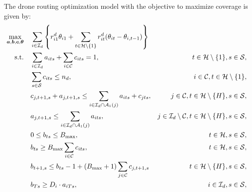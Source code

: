 \documentclass{article}
\newcommand{\set}[1]{\mathcal{#1}}
\begin{document}
The drone routing optimization model with the objective to maximize coverage is given by:
\begin{subequations} \label{eq:maxcov}
    \begin{align}
        \max_{\bm a, \bm b, \bm c, \bm \theta}  &\quad \displaystyle \sum_{i \in \set I_d} \left\{r_{i1}^d \theta_{i1} + \sum_{t \in \set H \setminus \{1\}} r_{it}^d (\theta_{it} - \theta_{i,t-1}) \right\} \label{eq:maxcov_a}%
        \\ {\rm s.t. } 
        &\quad \displaystyle \sum_{i \in \set I_d} a_{its} + \sum_{i \in \set C} c_{its} = 1, & t \in \set H \setminus \{1\}, s \in \set S, \label{eq:maxcov_b}\\
        &\quad \displaystyle \sum_{s \in \set S} c_{its} \leq n_d, & i \in \set C, t \in \set H \setminus \{1\}, \label{eq:maxcov_c}\\
        &\quad \displaystyle c_{j,t+1,s} + a_{j,t+1,s} \leq \sum_{i \in \set I_d \cap \set A_1(j)} a_{its} + c_{jts}, &  j \in \set C, t \in \set H \setminus \{H\}, s \in \set S, \label{eq:maxcov_d}\\
        &\quad \displaystyle a_{j,t+1,s} \leq \sum_{i \in \set I_d \cap \set A_1(j)} a_{its}, &  j \in \set I_d \setminus \set C, t \in \set H \setminus \{H\}, s \in \set S, \label{eq:maxcov_e}\\
        &\quad \displaystyle 0 \leq b_{ts} \leq B_{\text{max}}, & t \in \set H, s \in \set S, \label{eq:maxcov_f}\\
        &\quad \displaystyle b_{ts} \geq B_{\text{max}} \sum_{i \in \set C} c_{its}, & t \in \set H, s \in \set S, \label{eq:maxcov_g}\\
        &\quad \displaystyle b_{t+1,s} \leq b_{ts} - 1 + (B_{\text{max}} + 1) \sum_{j \in \set C} c_{j,t+1,s} & t \in \set H \setminus \{H\}, s \in \set S, \label{eq:maxcov_h}\\
        &\quad \displaystyle b_{Ts} \geq D_i \cdot a_{iTs}, & i \in \set I_d, s \in \set S, \label{eq:maxcov_i}\\

\end{align}
\end{subequations}
\end{document}
